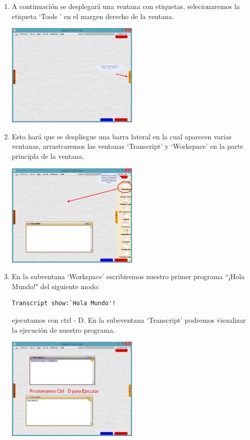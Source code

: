 \documentclass[11pt]{article}
\begin{document}
\begin{enumerate}
\item
A continuación se desplegará una ventana con etiquetas, selecionaremos la etiqueta `Tools ' en el margen derecho de la ventana.
				\begin{center}
				\includegraphics[width=0.5\textwidth]{images/tools}
				\end{center}
\item
Esto hará que se despliegue una barra lateral en la cual aparecen varias ventanas, arrastraremos las ventanas `Transcript' y `Workspace' en la parte principla de la ventana.
				\begin{center}
				\includegraphics[width=0.5\textwidth]{images/drag_tools}
				\end{center}
\item
En la subventana `Workspace' escribiremos nuestro primer programa ``¡Hola Mundo!" del siguiente modo:
\begin{lstlisting}
Transcript show:`Hola Mundo'! 
\end{lstlisting}
ejecutamos con ctrl - D. En la subeventana `Transcript' podremos visualizar la ejecución de nuestro programa.
				\begin{center}
				\includegraphics[width=0.5\textwidth]{images/executing}
				\end{center}


\end{enumerate}
\end{document}
